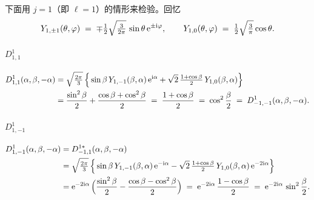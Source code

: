 下面用 $j=1$（即 $\ell=1$）的情形来检验。回忆
\[
  Y_{1,\pm 1}(\theta,\varphi) \;=\; \mp\tfrac{1}{2}\sqrt{\tfrac{3}{2\pi}}\,\sin\theta\,\mathrm{e}^{\pm\mathrm{i}\varphi}, \qquad
  Y_{1,0}(\theta,\varphi)\;=\;\tfrac{1}{2}\sqrt{\tfrac{3}{\pi}}\cos\theta.
\]

\paragraph{$D^{1}_{1,1}$}
\begin{align}
  D^{1}_{1,1}(\alpha,\beta,-\alpha)
  &= \sqrt{\tfrac{2\pi}{3}}\,\Big\{\sin\beta\,Y_{1,-1}(\beta,\alpha)\,\mathrm{e}^{\mathrm{i}\alpha}
     + \sqrt{2}\,\tfrac{1+\cos\beta}{2}\,Y_{1,0}(\beta,\alpha)\Big\} \notag\\
  &= \frac{\sin^2\beta}{2} + \frac{\cos\beta+\cos^2\beta}{2}
   \;=\; \frac{1+\cos\beta}{2} \;=\; \cos^2\frac{\beta}{2} \;=\; D^{1}_{-1,-1}(\alpha,\beta,-\alpha).
\end{align}

\paragraph{$D^{1}_{1,-1}$}
\begin{align}
  D^{1}_{1,-1}(\alpha,\beta,-\alpha)
  &= D^{1*}_{-1,1}(\alpha,\beta,-\alpha) \notag\\
  &= \sqrt{\tfrac{2\pi}{3}}\,\Big\{\sin\beta\,Y_{1,-1}(\beta,\alpha)\,\mathrm{e}^{-\mathrm{i}\alpha}
     - \sqrt{2}\,\tfrac{1+\cos\beta}{2}\,Y_{1,0}(\beta,\alpha)\,\mathrm{e}^{-2\mathrm{i}\alpha}\Big\} \notag\\
  &= \mathrm{e}^{-2\mathrm{i}\alpha}\,\Big(\frac{\sin^2\beta}{2} - \frac{\cos\beta-\cos^2\beta}{2}\Big)
   \;=\; \mathrm{e}^{-2\mathrm{i}\alpha}\,\frac{1-\cos\beta}{2} \;=\; \mathrm{e}^{-2\mathrm{i}\alpha}\,\sin^2\frac{\beta}{2}.
\end{align}

